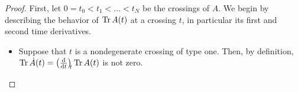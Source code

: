 \begin{proof}
First, let $0 = t_0 < t_1 < \dots < t_N$ be the crossings of $A$. We begin by describing the behavior of $\operatorname{Tr} A(t)$ at a crossing $t$, in particular its first and second time derivatives.

\begin{itemize}
\item Suppose that $t$ is a nondegenerate crossing of type one. Then, by definition, $\trace \dot A(t) = \diff{}t[t] \trace A(t)$ is not zero.
\end{itemize}
\end{proof}